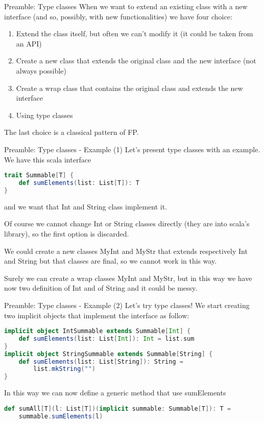 \begin{frame}{Preamble: Type classes}
	When we want to extend an existing class with a new interface 
	(and so, possibly, with new functionalities) we have four choice:	
	\begin{enumerate}[<+->]
		\item Extend the class itself, but often we can't modify it (it could be taken from an API)
		\item Create a new class that extends the original class and the new interface (not always possible)
		\item Create a wrap class that contains the original class and extends the new interface
		\item Using type classes
	\end{enumerate}
	\pause[4]
	The last choice is a classical pattern of FP.			
\end{frame}

\begin{frame}[fragile]{Preamble: Type classes - Example (1)}
	Let's present type classes with an example.
	We have this scala interface
\begin{lstlisting}[language=scala]
trait Summable[T] {
	def sumElements(list: List[T]): T
}
\end{lstlisting}
	and we want that Int and String class implement it.

	\pause

	Of course we cannot change Int or String classes directly (they are into scala's library), so the first option is discarded.
	
	\pause
	
	We could create a new classes MyInt and MyStr that extends respectively Int and String but that classes are final, so we cannot work in 
	this way.
	
	\pause
	
	Surely we can create a wrap classes MyInt and MyStr, but in this way we have now two definition of Int and of String and it could be messy.
\end{frame}

\begin{frame}[fragile]{Preamble: Type classes - Example (2)}	
	Let's try type classes!
	We start creating two implicit objects that implement the interface as follow:
\begin{lstlisting}[language=scala]
implicit object IntSummable extends Summable[Int] {
	def sumElements(list: List[Int]): Int = list.sum
}
implicit object StringSummable extends Summable[String] {
	def sumElements(list: List[String]): String = 
		list.mkString("")
}
\end{lstlisting}

	\pause

	In this way we can now define a generic method that use sumElements
\begin{lstlisting}[language=scala]
def sumAll[T](l: List[T])(implicit summable: Summable[T]): T =
	summable.sumElements(l)		
\end{lstlisting}	
\end{frame}

